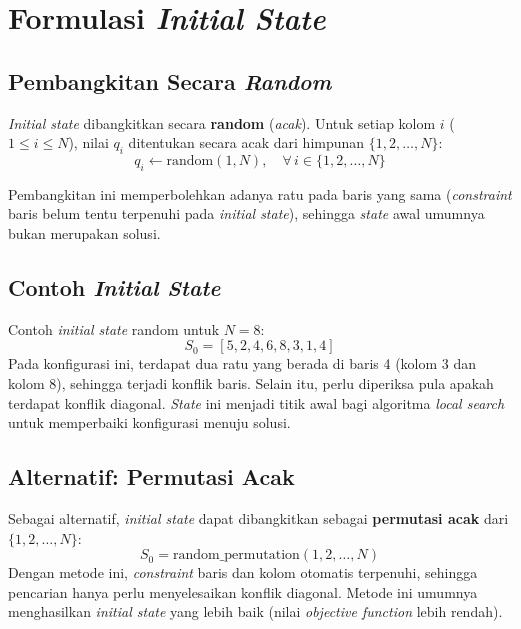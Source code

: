 \documentclass[12pt,a4paper]{article}
\begin{document}
\section{Formulasi \textit{Initial State}}
\label{sec:initial-state}

\subsection{Pembangkitan Secara \textit{Random}}
\label{subsec:random-init}

\textit{Initial state} dibangkitkan secara \textbf{random} (\textit{acak}). Untuk setiap kolom $i$ ($1 \leq i \leq N$), nilai $q_i$ ditentukan secara acak dari himpunan $\{1, 2, \ldots, N\}$:
\[
    q_i \leftarrow \text{random}(1, N), \quad \forall\, i \in \{1, 2, \ldots, N\}
\]

Pembangkitan ini memperbolehkan adanya ratu pada baris yang sama (\textit{constraint} baris belum tentu terpenuhi pada \textit{initial state}), sehingga \textit{state} awal umumnya bukan merupakan solusi.

\subsection{Contoh \textit{Initial State}}
\label{subsec:contoh-initial}

Contoh \textit{initial state} random untuk $N = 8$:
\[
    S_0 = [5, 2, 4, 6, 8, 3, 1, 4]
\]
Pada konfigurasi ini, terdapat dua ratu yang berada di baris 4 (kolom 3 dan kolom 8), sehingga terjadi konflik baris. Selain itu, perlu diperiksa pula apakah terdapat konflik diagonal. \textit{State} ini menjadi titik awal bagi algoritma \textit{local search} untuk memperbaiki konfigurasi menuju solusi.

\subsection{Alternatif: Permutasi Acak}
\label{subsec:permutasi}

Sebagai alternatif, \textit{initial state} dapat dibangkitkan sebagai \textbf{permutasi acak} dari $\{1, 2, \ldots, N\}$:
\[
    S_0 = \text{random\_permutation}(1, 2, \ldots, N)
\]
Dengan metode ini, \textit{constraint} baris dan kolom otomatis terpenuhi, sehingga pencarian hanya perlu menyelesaikan konflik diagonal. Metode ini umumnya menghasilkan \textit{initial state} yang lebih baik (nilai \textit{objective function} lebih rendah).
\end{document}
